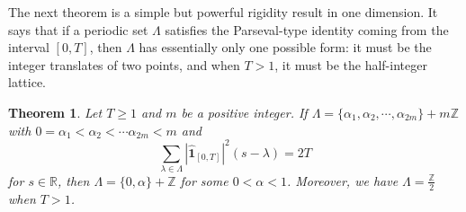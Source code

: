 \documentclass[12pt,a4paper,intlimits,sumlimits]{amsart}
\theoremstyle{plain}
\newtheorem{theorem}{Theorem}
\theoremstyle{definition}
\newcounter{rem}
\begin{document}
 The next theorem is a simple but powerful rigidity result in one dimension.
It says that if a periodic set $\Lambda$ satisfies the Parseval-type identity coming from the interval $[0,T]$, then $\Lambda$ has essentially only one possible form: it must be the integer translates of two points, and when $T>1$, it must be the half-integer lattice.  
\begin{theorem}\label{twoline1-4}
 Let $T\geq1$ and $m$ be a positive integer. If   $\Lambda =\{\alpha_1, \alpha_2, \cdots ,\alpha_{2m}\}+m\mathbb{Z}$
with   $0=\alpha_1< \alpha_2< \cdots \alpha_{2m}<m $ and  $$
\sum_{\lambda  \in \Lambda }\left|\hat{ \mathbf{1}}_{\left[0, T \right]}\right|^2\left(s-\lambda\right) = 2T $$ for   $s \in \mathbb{R}$, then $ \Lambda=\{0, \alpha\}+\mathbb{Z}$  for some $0<\alpha<1$. Moreover,  we have  $ \Lambda=   \frac{\mathbb{Z}}{2}$ when $T>1$. 
\end{theorem}
\end{document}
